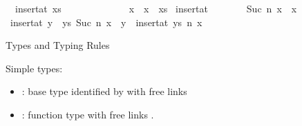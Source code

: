 \begin{isabellebody}
\ \ {\isachardoublequoteopen}insert{\isacharunderscore}{\kern0pt}at\ xs\ \ \ \ \ \ \ {}\ \ \ \ \ \ \ x\ {\isacharequal}{\kern0pt}\ x\ {\isacharhash}{\kern0pt}\ xs{\isachardoublequoteclose}\isanewline
{\isacharbar}{\kern0pt}\ {\isachardoublequoteopen}insert{\isacharunderscore}{\kern0pt}at\ {\isacharbrackleft}{\kern0pt}{\isacharbrackright}{\kern0pt}\ \ \ \ \ \ \ {\isacharparenleft}{\kern0pt}Suc\ n{\isacharparenright}{\kern0pt}\ x\ {\isacharequal}{\kern0pt}\ {\isacharbrackleft}{\kern0pt}x{\isacharbrackright}{\kern0pt}{\isachardoublequoteclose}\isanewline
{\isacharbar}{\kern0pt}\ {\isachardoublequoteopen}insert{\isacharunderscore}{\kern0pt}at\ {\isacharparenleft}{\kern0pt}y\ {\isacharhash}{\kern0pt}\ ys{\isacharparenright}{\kern0pt}\ {\isacharparenleft}{\kern0pt}Suc\ n{\isacharparenright}{\kern0pt}\ x\ {\isacharequal}{\kern0pt}\ y\ {\isacharhash}{\kern0pt}\ insert{\isacharunderscore}{\kern0pt}at\ ys\ n\ x{\isachardoublequoteclose}%
\begin{isamarkuptext}%
Types and Typing Rules%
\end{isamarkuptext}\isamarkuptrue%
%
\begin{isamarkuptext}%
Simple types:

%
\begin{itemize}%
\item {} : base type identified by  with free links 

\item {} : function type  with free links .


\end{itemize}
\end{isamarkuptext}
\end{isabellebody}
